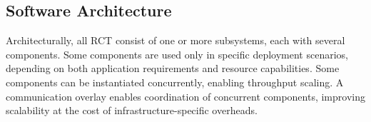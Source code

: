 \documentclass[preprint,12pt, a4paper]{elsarticle}
\begin{document}
\subsection{Software Architecture}\label{ssec:architecture}


Architecturally, all RCT consist of one or more subsystems, each with several
components. Some components are used only in specific deployment scenarios,
depending on both application requirements and resource capabilities. Some
components can be instantiated concurrently, enabling throughput scaling. A
communication overlay enables coordination of concurrent components, improving
scalability at the cost of infrastructure-specific overheads.



\end{document}
